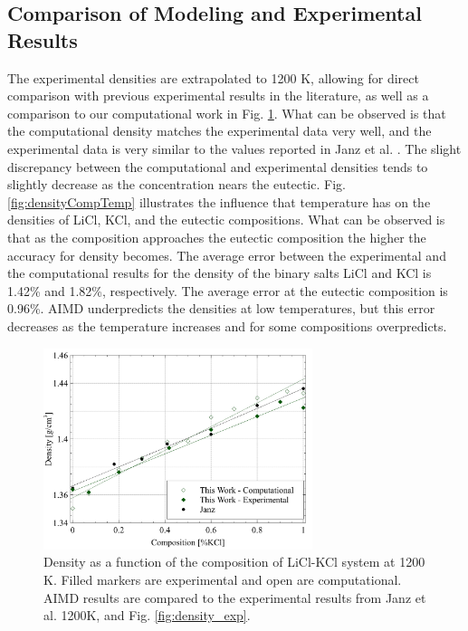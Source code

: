 \documentclass[review]{elsarticle}
\begin{document}
\FloatBarrier

\subsection{Comparison of Modeling and Experimental Results}

The experimental densities are extrapolated to 1200 K, allowing for direct comparison with previous experimental results in the literature, as well as a comparison to our computational work in Fig. \ref{fig:densityCompExp}. What can be observed is that the computational density matches the experimental data very well, and the experimental data is very similar to the values reported in Janz et al. \cite{janz1975molten,van1955electrical}. The slight discrepancy between the computational and experimental densities tends to slightly decrease as the concentration nears the eutectic. Fig. \ref{fig:densityCompTemp} illustrates the influence that temperature has on the densities of LiCl, KCl, and the eutectic compositions. What can be observed is that as the composition approaches the eutectic composition the higher the accuracy for density becomes. The average error between the experimental and the computational results for the density of the binary salts LiCl and KCl is 1.42\% and 1.82\%, respectively. The average error at the eutectic composition is 0.96\%. AIMD underpredicts the densities at low temperatures, but this error decreases as the temperature increases and for some compositions overpredicts.


\begin{figure}[h]
 \centering
 \includegraphics[width=0.7\textwidth]{images/density_comp.jpg} 
 \caption{Density as a function of the composition of LiCl-KCl system at 1200 K. Filled markers are experimental and open are computational. AIMD results are compared to the experimental results from Janz et al. \cite{janz1975molten,van1955electrical} 1200K, and Fig. \ref{fig:density_exp}.}
 \label{fig:densityCompExp}
\end{figure} 
\end{document}
